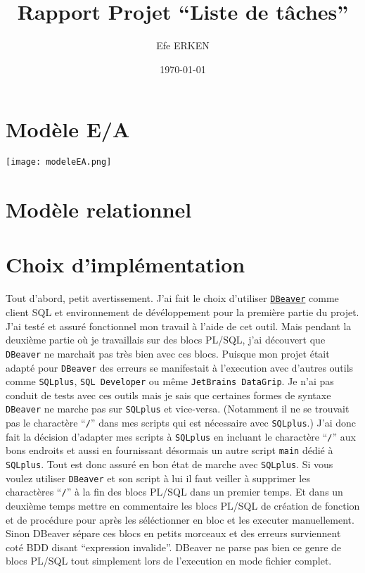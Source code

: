 \documentclass[12pt]{article}
\author{Efe ERKEN}
\date{\today}
\title{Rapport Projet ``Liste de tâches''}
\begin{document}
\maketitle

\section{Modèle E/A}
\begin{center}
	\texttt{[image: modeleEA.png]}
\end{center}

\section{Modèle relationnel}


\section{Choix d'implémentation}
Tout d'abord, petit avertissement. J'ai fait le choix d'utiliser
\href{https://dbeaver.io/}{\texttt{DBeaver}} comme client SQL et environnement
de dévéloppement pour la première partie du projet. J'ai testé et assuré
fonctionnel mon travail à l'aide de cet outil. Mais pendant la deuxième partie
où je travaillais sur des blocs PL/SQL, j'ai découvert que \texttt{DBeaver} ne
marchait pas très bien avec ces blocs.  Puisque mon projet était adapté pour
\texttt{DBeaver} des erreurs se manifestait à l'execution avec d'autres outils
comme \texttt{SQLplus}, \texttt{SQL Developer} ou même \texttt{JetBrains
DataGrip}. Je n'ai pas conduit de tests avec ces outils mais je sais que
certaines formes de syntaxe \texttt{DBeaver} ne marche pas sur \texttt{SQLplus}
et vice-versa. (Notamment il ne se trouvait pas le charactère ``\texttt{/}''
dans mes scripts qui est nécessaire avec \texttt{SQLplus}.) J'ai donc fait la
décision d'adapter mes scripts à \texttt{SQLplus} en incluant le charactère
``\texttt{/}'' aux bons endroits et aussi en fournissant désormais un autre
script \texttt{main} dédié à \texttt{SQLplus}. Tout est donc assuré en bon état
de marche avec \texttt{SQLplus}.  Si vous voulez utiliser \texttt{DBeaver} et
son script à lui il faut veiller à supprimer les charactères ``\texttt{/}'' à la
fin des blocs PL/SQL dans un premier temps.  Et dans un deuxième temps mettre en
commentaire les blocs PL/SQL de création de fonction et de procédure pour après
les séléctionner en bloc et les executer manuellement. Sinon DBeaver sépare ces
blocs en petits morceaux et des erreurs surviennent coté BDD disant ``expression
invalide''.  DBeaver ne parse pas bien ce genre de blocs PL/SQL tout simplement
lors de l'execution en mode fichier complet. \\
\end{document}
